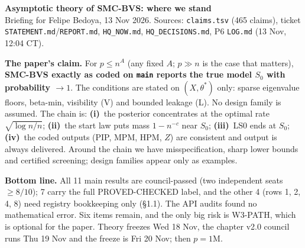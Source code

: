 \documentclass[11pt,a4paper]{article}
\newcommand{\cid}[1]{\texttt{\small #1}}
\newcommand{\Szero}{S_0}
\theoremstyle{definition}
\begin{document}
\begin{center}
{\Large\bfseries\sffamily Asymptotic theory of SMC-BVS: where we stand}\\[2pt]
{\footnotesize Briefing for Felipe Bedoya, 13 Nov 2026. Sources: \cid{claims.tsv} (465 claims), ticket
\cid{STATEMENT.md}/\cid{REPORT.md}, \cid{HQ\_NOW.md}, \cid{HQ\_DECISIONS.md}, P6 \cid{LOG.md} (13 Nov, 12:04 CT).}
\end{center}
\vspace{-4pt}
{\small\textbf{The paper's claim.} For $p\le n^{A}$ (any fixed $A$; $p\gg n$ is the case that matters), \textbf{SMC-BVS
exactly as coded on \texttt{main} reports the true model $\Szero$ with probability $\to1$}. The conditions are stated
on $(X,\theta^*)$ only: sparse eigenvalue floors, beta-min, visibility (V) and bounded leakage (L). No design family
is assumed. The chain is: \textbf{(i)}~the posterior concentrates at the optimal rate $\sqrt{\log n/n}$;
\textbf{(ii)}~the start law puts mass $1-n^{-c}$ near $\Szero$; \textbf{(iii)}~LS0 ends at $\Szero$; \textbf{(iv)}~the
coded outputs (PIP, MPM, HPM, $\hat Z$) are consistent and output is always delivered. Around the chain we have
misspecification, sharp lower bounds and certified screening; design families appear only as examples.\par}

\smallskip
\noindent\colorbox{soft}{\begin{minipage}{\dimexpr\linewidth-2\fboxsep}\small
\textbf{Bottom line.} All 11 main results are council-passed (two independent seats $\ge 8/10$); 7 carry the full
PROVED-CHECKED label, and the other 4 (rows 1, 2, 4, 8) need registry bookkeeping only (\S1.1). The API audits found no mathematical error. Six
items remain, and the only big risk is W3-PATH, which is optional for the paper. Theory freezes Wed 18 Nov, the
chapter v2.0 council runs Thu 19 Nov and the freeze is Fri 20 Nov; then $p=1$M.\end{minipage}}
\end{document}
